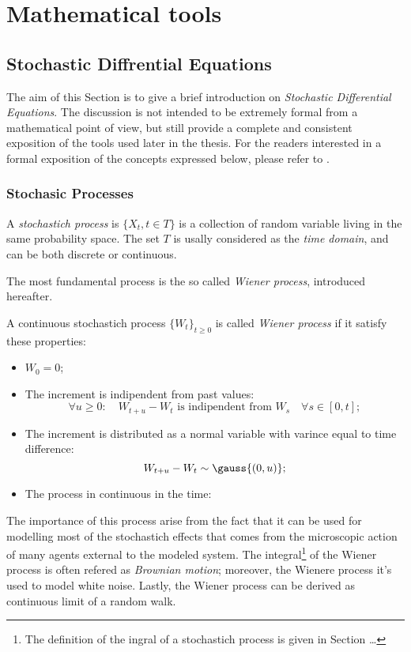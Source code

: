 \chapter{Mathematical tools}
\section{Stochastic Diffrential Equations}
The aim of this Section is to give a brief introduction on \emph{Stochastic Differential Equations}.
The discussion is not intended to be extremely formal from a mathematical point of view,
but still provide a complete and consistent exposition of the tools used later in the thesis.
For the readers interested in a formal exposition of the concepts expressed below, please refer to \cite{morters2010brownian}.

\subsection{Stochasic Processes}
\begin{Definition}
  A \emph{stochastich process} is \(\{X_t, t\in T\}\) is a collection of random variable living in the same probability space.
  The set \(T\) is usally considered as the \emph{time domain}, and can be both discrete or continuous.
\end{Definition}

The most fundamental process is the so called \emph{Wiener process}, introduced hereafter.
\begin{Definition}
  A continuous stochastich process \(\{W_t\}_{t\ge0}\) is called \emph{Wiener process} if it satisfy these properties:
  \begin{itemize}
    \item \(W_0 = 0\);
    \item The increment is indipendent from past values:
          \[\forall u\ge0: \quad W_{t+u} - W_t  \text{ is indipendent from } W_s \quad \forall s\in[0,t];\]
    \item The increment is distributed as a normal variable with varince equal to time difference:
          \[W_{t+u}-W_t \sim \gauss{(0,u)};\]
    \item The process in continuous in the time:
          \[\] %
  \end{itemize}
\end{Definition}
The importance of this process arise from the fact that it can be used for modelling
most of the stochastich effects that comes from the microscopic action of many agents
external to the modeled system. The integral\footnote{The definition of the ingral of a stochastich process is given in Section \dots} %
of the Wiener process is often refered as \emph{Brownian motion}; moreover, the Wienere process it's used to model
white noise. Lastly, the Wiener process can be derived as continuous limit of a 
random walk.

